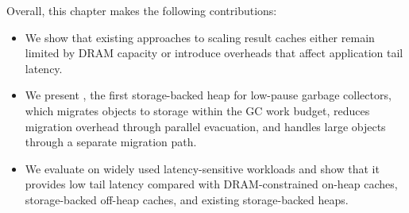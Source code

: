 Overall, this chapter makes the following contributions:

\begin{itemize}
	\item We show that existing approaches to scaling result caches either remain limited by DRAM capacity or introduce overheads that affect application tail latency.

	\item We present \chipperName{}, the first storage-backed heap for low-pause garbage collectors, which migrates objects to storage within the GC work budget, reduces migration overhead through parallel evacuation, and handles large objects through a separate migration path.

	\item We evaluate \chipperName{} on widely used latency-sensitive workloads and show that it provides low tail latency compared with DRAM-constrained on-heap caches, storage-backed off-heap caches, and existing storage-backed heaps.

\end{itemize}
